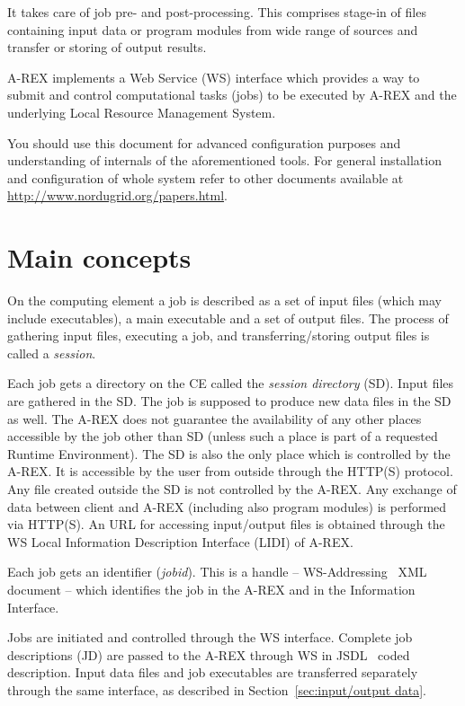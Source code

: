 \documentclass{article}                            %
\begin{document}
It takes care of job pre- and post-processing. This comprises
stage-in of files containing input data or program modules from wide
range of sources and transfer or storing of output results.

A-REX implements a Web Service (WS) interface which provides a
way to submit and control computational tasks (jobs) to be executed
by A-REX and the underlying Local Resource Management System.

\begin{framed}You should use this document for advanced configuration purposes
and understanding of internals of the aforementioned tools. For general
installation and configuration of whole system refer to other documents
available at \url{http://www.nordugrid.org/papers.html}.
\end{framed}

\section{Main concepts\label{sec:main concepts}}

On the computing element a job is described as a set of input files
(which may include executables), a main executable and a set of output
files. The process of gathering input files, executing a job, and
transferring/storing output files is called a \emph{session}.

Each job gets a directory on the CE called the \emph{session directory}
(SD). Input files are gathered in the SD. The job is supposed to produce
new data files in the SD as well. The A-REX does not guarantee the
availability of any other places accessible by the job other than
SD (unless such a place is part of a requested Runtime Environment).
The SD is also the only place which is controlled by the A-REX. It
is accessible by the user from outside through the HTTP(S) protocol.
Any file created outside the SD is not controlled by the A-REX. Any
exchange of data between client and A-REX (including also program
modules) is performed via HTTP(S). An URL for accessing input/output
files is  obtained through the WS Local Information Description Interface
(LIDI) of A-REX.

Each job gets an identifier (\textit{jobid}). This is a handle -- WS-Addressing~\cite{ws-addr-soap} XML document -- which identifies the job in the
A-REX and in the Information Interface.

Jobs are initiated and controlled through the WS interface. Complete
job descriptions (JD) are passed to the A-REX through WS in JSDL~\cite{jsdl}
coded description. Input data files and job executables are transferred
separately through the same interface, as described in Section~\ref{sec:input/output data}.
\end{document}
